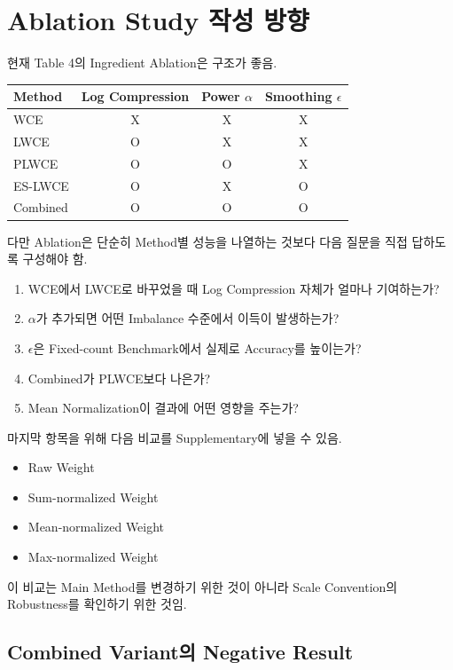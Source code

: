 \documentclass[11pt,a4paper]{article}
\begin{document}
\section{Ablation Study 작성 방향}

현재 Table 4의 Ingredient Ablation은 구조가 좋음.

\begin{center}
\begin{tabular}{lccc}
\toprule
Method & Log Compression & Power \(\alpha\) & Smoothing \(\epsilon\) \\
\midrule
WCE & X & X & X \\
LWCE & O & X & X \\
PLWCE & O & O & X \\
ES-LWCE & O & X & O \\
Combined & O & O & O \\
\bottomrule
\end{tabular}
\end{center}

다만 Ablation은 단순히 Method별 성능을 나열하는 것보다 다음 질문을 직접 답하도록 구성해야 함.

\begin{enumerate}
\item WCE에서 LWCE로 바꾸었을 때 Log Compression 자체가 얼마나 기여하는가?
\item \(\alpha\)가 추가되면 어떤 Imbalance 수준에서 이득이 발생하는가?
\item \(\epsilon\)은 Fixed-count Benchmark에서 실제로 Accuracy를 높이는가?
\item Combined가 PLWCE보다 나은가?
\item Mean Normalization이 결과에 어떤 영향을 주는가?
\end{enumerate}

마지막 항목을 위해 다음 비교를 Supplementary에 넣을 수 있음.

\begin{itemize}
\item Raw Weight
\item Sum-normalized Weight
\item Mean-normalized Weight
\item Max-normalized Weight
\end{itemize}

이 비교는 Main Method를 변경하기 위한 것이 아니라 Scale Convention의 Robustness를 확인하기 위한 것임.

\subsection{Combined Variant의 Negative Result}
\end{document}
